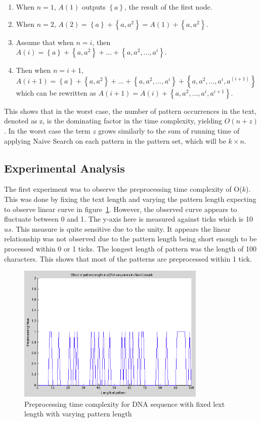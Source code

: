 \documentclass[paper=a4, fontsize=11pt]{scrartcl} %
\numberwithin{equation}{section} %
\numberwithin{figure}{section} %
\numberwithin{table}{section} %
\begin{document}
\begin{enumerate}
  \item When $n = 1$, $A(1)$ outputs $\left\{a\right\}$, the result of the first node.
  \item When $n = 2$, $A(2) = \left\{a\right\} + \left\{a, a^2\right\} = A(1) + \left\{a, a^2\right\}$.
  \item Assume that when $n = i$, then $A(i) =  \left\{a\right\} + \left\{a, a^2\right\} + \dots + \left\{a, a^2, ..., a^i\right\}$.
  \item Then when $n = i+1$, $A(i+1) = \left\{a\right\} + \left\{a, a^2\right\} + \dots + \left\{a, a^2, ..., a^i\right\} + \left\{a, a^2, ..., a^i, a^{(i+1)}\right\}$ which can be rewritten as  $A(i+1) = A(i) + \left\{a, a^2, ..., a^i, a^{i+1}\right\}$.
\end{enumerate}
This shows that in the worst case, the number of pattern occurrences in the text, denoted as z, is the dominating factor in the time complexity, yielding $O(n+z)$. In the worst case the term $z$ grows similarly to the sum of running time of applying Naive Search on each pattern in the pattern set, which will be $k\times n$.

\subsection{Experimental Analysis}
The first experiment was to observe the preprocessing time complexity of O($k$). This was done by fixing the text length and varying the pattern length expecting to observe linear curve in figure~\ref{fig:pre-fixed-text}. However, the observed curve appears to fluctuate between 0 and 1. The y-axis here is measured against ticks which is 10$us$. This measure is quite sensitive due to the unity. It appears the linear relationship was not observed due to the pattern length being short enough to be processed within 0 or 1 ticks. The longest length of pattern was the length of 100 characters. This shows that most of the patterns are preprocessed within 1 tick.

\begin{figure}[h!]
\centering
\includegraphics[width=0.8\textwidth]{figures/Pre-DNA-fixed-text.png}
\caption{Preprocessing time complexity for DNA sequence with fixed lext length with varying pattern length}
\label{fig:pre-fixed-text}
\end{figure}
\end{document}
